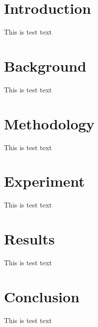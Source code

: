 \chapter{Introduction}
This is test text
\chapter{Background}
This is test text
\chapter{Methodology}
This is test text
\chapter{Experiment}
This is test text
\chapter{Results}
This is test text
\chapter{Conclusion}
This is test text
